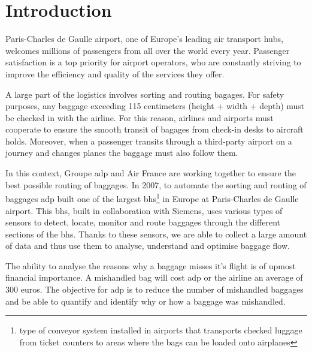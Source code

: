\documentclass[12pt]{article}
\begin{document}
\newpage

\renewcommand{\contentsname}{Table of contents}\tableofcontents

\newpage
\listoffigures
\listoftables
\newpage


\section*{Introduction}
\label{introduction}

Paris-Charles de Gaulle airport, one of Europe's leading air transport hubs, welcomes millions of passengers from all over the world every year. Passenger satisfaction is a top priority for airport operators, who are constantly striving to improve the efficiency and quality of the services they offer.  \hfill \break


A large part of the logistics involves sorting and routing bagages. For safety purposes, any baggage exceeding 115 centimeters (height + width + depth) must be checked in with the airline. For this reason, airlines and airports must cooperate to ensure the smooth transit of bagages from check-in desks to aircraft holds. Moreover, when a passenger transits through a third-party airport on a journey and changes planes the baggage must also follow them. \hfill \break


In this context, Groupe \acrshort{adp} and Air France are working together to ensure the best possible routing of baggages. In 2007, to automate the sorting and routing of baggages  \acrshort{adp} built one of the largest \acrlong{bhs}\footnote{type of conveyor system installed in airports that transports checked luggage from ticket counters to areas where the bags can be loaded onto airplanes} in Europe at Paris-Charles de Gaulle airport. This \acrshort{bhs}, built in collaboration with Siemens, uses various types of sensors to detect, locate, monitor and route baggages through the different sections of the \acrshort{bhs}. Thanks to these sensors, we are able to collect a large amount of data and thus use them to analyse, understand and optimise baggage flow.  \hfill \break

The ability to analyse the reasons why a baggage misses it's flight is of upmost financial importance. A mishandled bag will cost \acrshort{adp} or the airline an average of 300 euros. The objective for \acrshort{adp} is to reduce the number of mishandled baggages and be able to quantify and identify why or how a baggage was mishandled. \hfill \break
\end{document}

